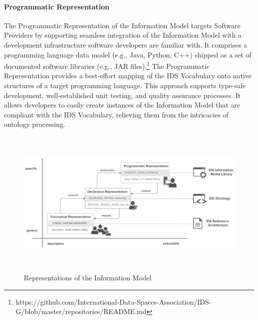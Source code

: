 \paragraph{Programmatic Representation\\}
The Programmatic Representation of the Information Model targets Software Providers by supporting seamless integration of the Information Model with a development infrastructure software developers are familiar with. It comprises a programming language data model (e.g., Java, Python, C++) shipped as a set of documented software libraries (e.g., JAR files).\footnote{https://github.com/International-Data-Spaces-Association/IDS-G/blob/master/repositories/README.md }
The Programmatic Representation provides a best-effort mapping of the IDS Vocabulary onto native structures of a target programming language. This approach supports type-safe development, well-established unit testing, and quality assurance processes. It allows developers to easily create instances of the Information Model that are compliant with the IDS Vocabulary, relieving them from the intricacies of ontology processing.




\begin{figure}[H]
	\begin{Center}
		\includegraphics[width=6.53in,height=2.83in]{./media/image31.png}
		\caption{Representations of the Information Model}
		\label{fig:Representations_of_the_Information_Model}
	\end{Center}
\end{figure}


